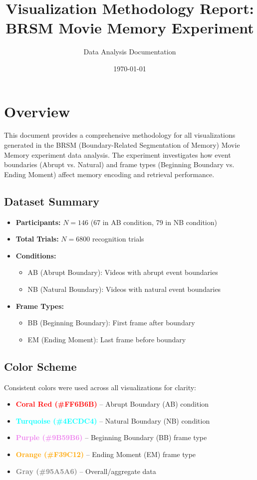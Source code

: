 \documentclass[12pt,a4paper]{article}
\title{\textbf{Visualization Methodology Report:\\BRSM Movie Memory Experiment}}
\author{Data Analysis Documentation}
\date{\today}
\begin{document}
\maketitle
\tableofcontents
\newpage

\section{Overview}

This document provides a comprehensive methodology for all visualizations generated in the BRSM (Boundary-Related Segmentation of Memory) Movie Memory experiment data analysis. The experiment investigates how event boundaries (Abrupt vs. Natural) and frame types (Beginning Boundary vs. Ending Moment) affect memory encoding and retrieval performance.

\subsection{Dataset Summary}
\begin{itemize}
    \item \textbf{Participants:} $N = 146$ (67 in AB condition, 79 in NB condition)
    \item \textbf{Total Trials:} $N = 6800$ recognition trials
    \item \textbf{Conditions:} 
        \begin{itemize}
            \item AB (Abrupt Boundary): Videos with abrupt event boundaries
            \item NB (Natural Boundary): Videos with natural event boundaries
        \end{itemize}
    \item \textbf{Frame Types:}
        \begin{itemize}
            \item BB (Beginning Boundary): First frame after boundary
            \item EM (Ending Moment): Last frame before boundary
        \end{itemize}
\end{itemize}

\subsection{Color Scheme}
Consistent colors were used across all visualizations for clarity:
\begin{itemize}
    \item \textcolor{red}{\textbf{Coral Red (\#FF6B6B)}} -- Abrupt Boundary (AB) condition
    \item \textcolor{cyan}{\textbf{Turquoise (\#4ECDC4)}} -- Natural Boundary (NB) condition
    \item \textcolor{violet}{\textbf{Purple (\#9B59B6)}} -- Beginning Boundary (BB) frame type
    \item \textcolor{orange}{\textbf{Orange (\#F39C12)}} -- Ending Moment (EM) frame type
    \item \textcolor{gray}{\textbf{Gray (\#95A5A6)}} -- Overall/aggregate data
\end{itemize}
\end{document}
